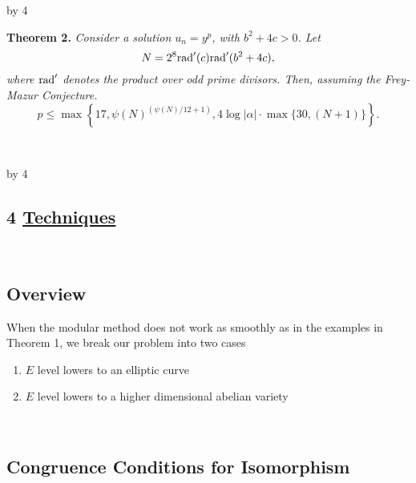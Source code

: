\documentclass[12pt]{scrartcl}
\newcommand{\rad}{{\rm{rad}}}
\def\anzspalten{4}
\newlength{\kastenwidth}
\newenvironment{kasten}{%
  \begin{lrbox}{\dummybox}%
    \begin{minipage}{0.96\linewidth}}%
    {\end{minipage}%
  \end{lrbox}%
  \raisebox{-\depth}{\psshadowbox[framesep=1em]{\usebox{\dummybox}}}\\[0.5em]}
\newenvironment{spalte}{%
  \setlength\kastenwidth{1.2\textwidth}
  \divide\kastenwidth by \anzspalten
  \begin{minipage}[t]{\kastenwidth}}{\end{minipage}\hfill}
\begin{document}
\begin{lrbox}{\spalten}
{\begin{spalte}
\begin{kasten}
\textbf{\large\color{blue} Theorem 2.} \textit{Consider a solution $u_n = y^p$, with $b^2+4c >0$. Let \[ N = 2^8  {\rad}'(c)\rad'(b^2+4c),\]
where $\rad'$ denotes the product over odd prime divisors.  Then, assuming the Frey-Mazur Conjecture. 
\[ p \leq \max\left\{17,   \psi(N)^{(\psi(N)/12+1)}, 4\log{|\alpha|} \cdot  \max\{30,( N+1)\}  \right\}. \]}

\end{kasten}




\end{spalte}
    \begin{spalte}


\begin{kasten}
\section*{4 \hspace{0.1cm} {\color{red} 
\underline{Techniques}}}
\end{kasten}

\begin{kasten}

\subsection*{\color{blue} Overview}

When the modular method does not work as smoothly as in the examples in Theorem 1, we break our problem into two cases
\begin{enumerate}

\item $E$ level lowers to an elliptic curve

\item $E$ level lowers to a higher dimensional abelian variety

\end{enumerate}



\end{kasten}

\begin{kasten}

\subsection*{ \color{blue} Congruence Conditions for Isomorphism}


\end{kasten}
\end{spalte}}
\end{lrbox}
\end{document}
